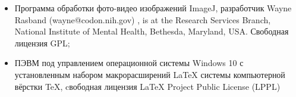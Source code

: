 \begin{itemize}


%	
	\item  Программа обработки фото-видео изображений ImageJ, разработчик  Wayne Rasband (wayne@codon.nih.gov) , is at the Research Services Branch, National Institute of Mental Health, Bethesda, Maryland, USA. Свободная лицензия GPL;
	\item  ПЭВМ под управлением операционной системы Windows 10 с установленным набором макрорасширений LaTeX системы компьютерной вёрстки TeX, cвободная лицензия LaTeX Project Public License (LPPL)
\end{itemize}